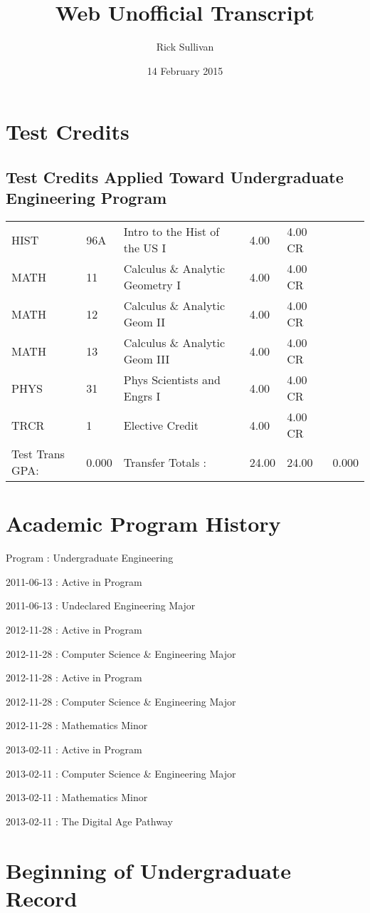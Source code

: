 \documentclass{article}\usepackage[T1]{fontenc}
\title{Web Unofficial Transcript}
\author{Rick Sullivan}
\date{14 February 2015}
\begin{document}
\maketitle

\section{Test Credits}
\subsection{Test Credits Applied Toward Undergraduate Engineering Program}
\begin{tabu}{ l  l  l  l  l  l }
HIST&96A&Intro to the Hist of the US I&4.00&4.00 CR&\\
MATH&11&Calculus \& Analytic Geometry I&4.00&4.00 CR&\\
MATH&12&Calculus \& Analytic Geom II&4.00&4.00 CR&\\
MATH&13&Calculus \& Analytic Geom III&4.00&4.00 CR&\\
PHYS&31&Phys Scientists and Engrs I&4.00&4.00 CR&\\
TRCR&1&Elective Credit&4.00&4.00 CR&\\
Test Trans GPA:&0.000&Transfer Totals :&24.00&24.00&0.000\\\end{tabu}
\section{Academic Program History}
Program	:	Undergraduate Engineering \

2011-06-13	:	Active in Program \

2011-06-13 : Undeclared Engineering Major \

2012-11-28	:	Active in Program \

2012-11-28 : Computer Science \& Engineering Major \

2012-11-28	:	Active in Program \

2012-11-28 : Computer Science \& Engineering Major \

2012-11-28 : Mathematics Minor \

2013-02-11	:	Active in Program \

2013-02-11 : Computer Science \& Engineering Major \

2013-02-11 : Mathematics Minor \

2013-02-11 : The Digital Age Pathway \

\section{Beginning of Undergraduate Record}
\end{document}
